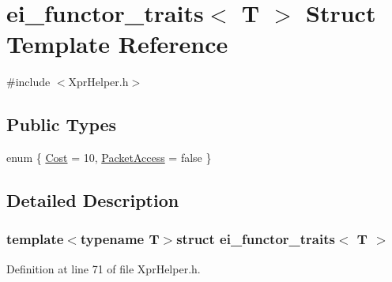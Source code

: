 \hypertarget{structei__functor__traits}{\section{ei\-\_\-functor\-\_\-traits$<$ T $>$ Struct Template Reference}
\label{structei__functor__traits}
}


{\ttfamily \#include $<$Xpr\-Helper.\-h$>$}

\subsection*{Public Types}
\begin{DoxyCompactItemize}
\item 
enum \{ \hyperlink{structei__functor__traits_a26a3ac5ec00d034327de204ae1fbd85bab5f31087ee333273ce8b57fa30b8c5f3}{Cost} = 10, 
\hyperlink{structei__functor__traits_a26a3ac5ec00d034327de204ae1fbd85bad392d5a6225b61e6ca26f9824f1b2a37}{Packet\-Access} = false
 \}
\end{DoxyCompactItemize}


\subsection{Detailed Description}
\subsubsection*{template$<$typename T$>$struct ei\-\_\-functor\-\_\-traits$<$ T $>$}



Definition at line 71 of file Xpr\-Helper.\-h.



